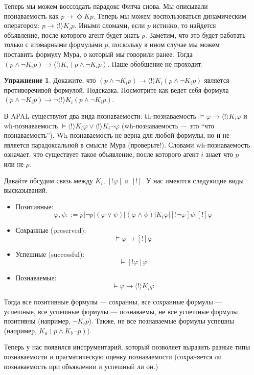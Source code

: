 \documentclass[openany]{book}
\theoremstyle{plain}
\theoremstyle{definition}
\newtheorem{xrc}{Упражнение}[]
\begin{document}
Теперь мы можем воссоздать парадокс Фитча снова. Мы описывали познаваемость как \(p \to \Diamond K p\). Теперь мы можем воспользоваться динамическим оператором: \(p \to \langle ! \rangle K_i p\). Иными сломами, если \(p\) истинно, то найдется объявление, после которого агент будет знать \(p\). Заметим, что это будет работать только с атомарными формулами \(p\), поскольку в ином случае мы можем поставить формулу Мура, о который мы говорили ранее. Тогда \((p \land \neg K_i p) \to \langle ! \rangle K_i (p \land \neg K_i p)\). Наше обобщение не проходит.

\begin{xrc}
Докажите, что \((p \land \neg K_i p) \to \langle ! \rangle K_i (p \land \neg K_i p)\) является противоречивой формулой. Подсказка. Посмотрите как ведет себя формула \((p \land \neg K_i p) \to \neg \langle ! \rangle K_i (p \land \neg K_i p)\).
\end{xrc}

В APAL существуют два вида познаваемости: th-познаваемость \(\models \varphi \to \langle ! \rangle K_i \varphi\) и wh-познаваемость \(\models \langle ! \rangle K_i \varphi \lor \langle ! \rangle K_i \neg \varphi\) (wh-познаваемость --- это ``что познаваемость''). Wh-познаваемость не верна для любой формулы, но и не является парадоксальной в смысле Мура (проверьте!). Словами wh-познаваемость означает, что существует такое объявление, после которого агент \(i\) знает что \(p\) или не \(p\).

Давайте обсудим связь между \(K_i\), \([! \varphi]\) и \([!]\). У нас имеются следующие виды высказываний. 
\begin{itemize}
\item Позитивные: \[\varphi, \psi ::= p | \neg p | (\varphi \lor \psi) | (\varphi \land \psi) | K_i \varphi | [!\neg\varphi] \psi | [!] \varphi\]
\item Сохранные (preserved): \[\models \varphi \to [!] \varphi\]
\item Успешные (successful): \[\models [! \varphi] \varphi\]
\item Познаваемые: \[\models \varphi \to \langle ! \rangle K_i \varphi\]
\end{itemize}

Тогда все позитивные формулы --- сохранны, все сохранные формулы --- успешные, все успешные формулы --- познаваемы, не все успешные формулы позитивны (например, \(\neg K_i p\)). Также, не все познаваемые формулы успешны (например, \(K_a (p \land K_b \neg p)\)).

Теперь у нас появился инструментарий, который позволяет выразить разные типы познаваемости и прагматическую оценку познаваемости (сохраняется ли познаваемость при объявлении и успешный ли он.)
\end{document}

